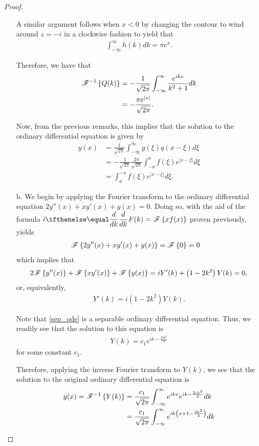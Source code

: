 \begin{proof}
\begin{enumerate}
      A similar argument follows when $x < 0$ by changing the contour to wind around $z=-i$ in a clockwise fashion to yield that
      \begin{align*}
        \int_{-\infty}^{\infty} h(k) dk = \pi e^{x}.
      \end{align*}

      Therefore, we have that
      \begin{align*}
        \mathscr{F}^{-1}\left\{ {Q(k)} \right\} &= -\frac{1}{\sqrt{2\pi}} \int_{-\infty}^{\infty} \frac{e^{i k x}}{k^2+1}  dk \\
        &= -\frac{\pi e^{|x|}}{\sqrt{2\pi}}.
      \end{align*}

      Now, from the previous remarks, this implies that the solution to the ordinary
      differential equation is given by
      \begin{align*}
        y(x) &= \frac{1}{\sqrt{2\pi}}\int_{-\infty}^{\infty} g(\xi) q(x-\xi)d\xi \\
        &= -\frac{1}{\sqrt{2\pi}}\frac{2\pi}{\sqrt{2\pi}}\int_{-a}^{a} f(\xi) e^{|x-\xi|} d\xi \\
        &= \int_{a}^{-a} f(\xi) e^{|x-\xi|} d\xi.
      \end{align*}
    \item[b.] We begin by applying the Fourier transform
      to the ordinary differential equation $2 y''(x) + x y'(x) + y(x) = 0$. Doing so, with
      the aid of the formula $\displaystyle i \der{k}{} F(k) = \fourier{x f(x)}$ proven previously, yields
      \begin{align*}
        \mathscr{F}\left\{ {2 y''(x) + x y'(x) + y(x)} \right\} &= \mathscr{F}\left\{ {0} \right\} = 0
      \end{align*}
      which implies that
      \begin{align*}
        2\mathscr{F}\left\{ {y''(x)} \right\} + \mathscr{F}\left\{ {x y'(x)} \right\} + \mathscr{F}\left\{ {y(x)} \right\} = i Y'(k) + \left(1 - 2k^2\right) Y(k) = 0,
      \end{align*}
      or, equivalently,
      \begin{align}\label{sep_ode}
        Y'(k) = i\left(1- 2k^2\right) Y(k) .
      \end{align}

      Note that \eqref{sep_ode} is a separable ordinary differential equation. Thus, we readily
      see that the solution to this equation is
      \begin{align*}
        Y(k) = c_1 e^{ik - \frac{2ik^3}{3}}
      \end{align*}
      for some constant $c_1$.

      Therefore, applying the inverse Fourier transform to $Y(k)$, we see that the solution
      to the original ordinary differential equation is
      \begin{align*}
        y(x) = \mathscr{F}^{-1}\left\{ {Y(k)} \right\} &= \frac{c_1}{\sqrt{2\pi}} \int_{-\infty}^{\infty}e^{ikx} e^{ik - \frac{2ik^3}{3}} dk \\
        &= \frac{c_1}{\sqrt{2\pi}} \int_{-\infty}^{\infty}e^{ik\left(x + 1 - \frac{2k^2}{3}\right) } dk
      \end{align*}
  \end{enumerate}
\end{proof}
\newpage
